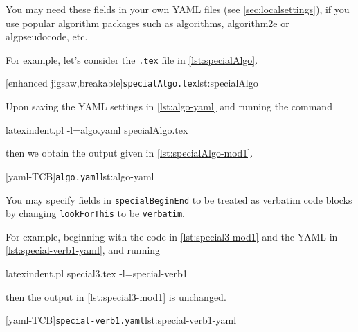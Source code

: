  You may need these fields in your own YAML files (see \vref{sec:localsettings}), if you
 use popular algorithm packages such as algorithms, algorithm2e or algpseudocode, etc.

 \begin{example}
 For example, let’s consider the \texttt{.tex} file in \cref{lst:specialAlgo}.
  

 [enhanced jigsaw,breakable]{\texttt{specialAlgo.tex}}{lst:specialAlgo}

 Upon saving the YAML settings in \cref{lst:algo-yaml} and running the command

 \begin{commandshell}
latexindent.pl -l=algo.yaml specialAlgo.tex
 \end{commandshell}

 then we obtain the output given in \cref{lst:specialAlgo-mod1}.

 \begin{cmhtcbraster}
  [yaml-TCB]{\texttt{algo.yaml}}{lst:algo-yaml}
 \end{cmhtcbraster}
 \end{example}

 You may  specify fields in
 \texttt{specialBeginEnd} to be treated as verbatim code blocks by changing
 \texttt{lookForThis} to be \texttt{verbatim}. %

 \begin{example}
 For example, beginning with the code in \cref{lst:special3-mod1} and the YAML in
 \cref{lst:special-verb1-yaml}, and running 

 \begin{commandshell}
latexindent.pl special3.tex -l=special-verb1
\end{commandshell}

 then the output in \cref{lst:special3-mod1} is unchanged.

 \begin{cmhtcbraster}
  [yaml-TCB]{\texttt{special-verb1.yaml}}{lst:special-verb1-yaml}
 \end{cmhtcbraster}
 \end{example}

